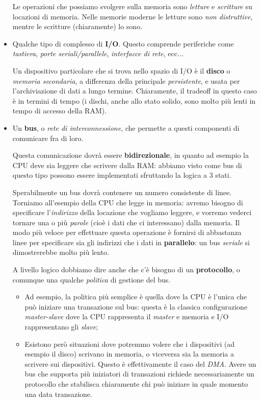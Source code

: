 \documentclass[a4paper,11pt]{article}
\begin{document}
\begin{itemize}
		Le operazioni che possiamo svolgere sulla memoria sono \textit{letture} e \textit{scritture} su locazioni di memoria.
		Nelle memorie moderne le letture sono \textit{non distruttive}, mentre le scritture (chiaramente) lo sono.

	\item Qualche tipo di complesso di \textbf{I/O}. Questo comprende periferiche come \textit{tastiera}, \textit{porte seriali/parallele}, \textit{interfacce di rete}, ecc...

		Un dispositivo particolare che si trova nello spazio di I/O è il \textbf{disco} o \textit{memoria secondaria}, a differenza della principale \textit{persistente}, e usata per l'archiviazione di dati a lungo termine.
		Chiaramente, il tradeoff in questo caso è in termini di tempo (i dischi, anche allo stato solido, sono molto più lenti in tempo di accesso della RAM).

	\item Un \textbf{bus}, o \textit{rete di interconnessione}, che permette a questi componenti di comunicare fra di loro.

		Questa comunicazione dovrà essere \textbf{bidirezionale}, in quanto ad esempio la CPU deve sia leggere che scrivere dalla RAM: abbiamo visto come bus di questo tipo possono essere implementati sfruttando la logica a 3 stati.

		Sperabilmente un bus dovrà contenere un numero consistente di linee.
		Torniamo all'esempio della CPU che legge in memoria: avremo bisogno di specificare l'\textit{indirizzo} della locazione che vogliamo leggere, e vorremo vederci tornare una o più \textit{parole} (cioè i dati che ci interessano) dalla memoria.
		Il modo più veloce per effettuare questa operazione è fornirsi di abbastanza linee per specificare sia gli indirizzi che i dati in \textbf{parallelo}: un bus \textit{seriale} si dimostrerebbe molto più lento.

		A livello logico dobbiamo dire anche che c'è bisogno di un \textbf{protocollo}, o comunque una qualche \textit{politica} di gestione del bus.
	\begin{itemize}
		\item Ad esempio, la politica più semplice è quella dove la CPU è l'unica che può iniziare una transazione sul bus: questa è la classica configurazione \textit{master-slave} dove la CPU rappresenta il \textit{master} e memoria e I/O rappresentano gli \textit{slave};
		\item Esistono però situazioni dove potremmo volere che i dispositivi (ad esempio il disco) scrivano in memoria, o viceversa sia la memoria a scrivere sui dispositivi. Questo è effettivamente il caso del \textit{DMA}.
			Avere un bus che supporta più iniziatori di transazioni richiede necessariamente un protocollo che stabilisca chiaramente chi può iniziare in quale momento una data transazione.
	\end{itemize}


\end{itemize}
\end{document}
